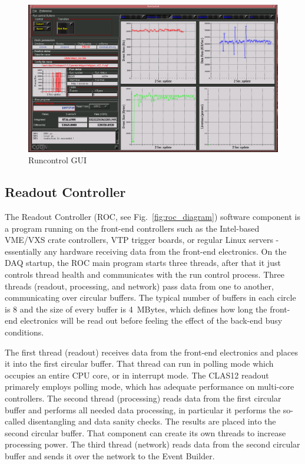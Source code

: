 \begin{figure}[hbt]
	\centering
	\includegraphics[width=1.0\columnwidth,keepaspectratio]{img/runcontrol1.png}
	\caption{Runcontrol GUI}
	\label{fig:runcontrol1}
\end{figure}





\subsection{Readout Controller}

The Readout Controller (ROC, see Fig.~\ref{fig:roc_diagram}) software component is a program running on the front-end controllers such as the Intel-based VME/VXS crate controllers, VTP trigger boards, or regular Linux servers - essentially any hardware receiving data from the front-end electronics. On the DAQ startup, the ROC main program starts three threads, after that it just controls thread health and communicates with the run control process. Three threads (readout, processing, and network) pass data from one to another, communicating over circular buffers. The typical number of buffers in each circle is 8 and the size of every buffer is 4~MBytes, which defines how long the front-end electronics will be read out before feeling the effect of the back-end busy conditions.

The first thread (readout) receives data from the front-end electronics and places it into the first circular buffer. That thread can run in polling mode which occupies an entire CPU core, or in interrupt mode. The CLAS12 readout primarely employs polling mode, which has adequate performance on multi-core controllers. The second thread (processing) reads data from the first circular buffer and performs all needed data processing, in particular it performs the so-called disentangling and data sanity checks. The results are placed into the second circular buffer. That component can create its own threads to increase processing power. The third thread (network) reads data from the second circular buffer and sends it over the network to the Event Builder.

